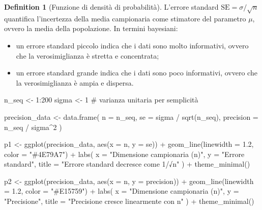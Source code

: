 \documentclass[
  letterpaper,
  DIV=11,
  numbers=noendperiod,
  oneside]{scrreprt}
\newenvironment{Shaded}{\begin{snugshade}}{\end{snugshade}}
\newcommand{\AttributeTok}[1]{\textcolor[rgb]{0.40,0.45,0.13}{#1}}
\newcommand{\CommentTok}[1]{\textcolor[rgb]{0.37,0.37,0.37}{#1}}
\newcommand{\DecValTok}[1]{\textcolor[rgb]{0.68,0.00,0.00}{#1}}
\newcommand{\FloatTok}[1]{\textcolor[rgb]{0.68,0.00,0.00}{#1}}
\newcommand{\FunctionTok}[1]{\textcolor[rgb]{0.28,0.35,0.67}{#1}}
\newcommand{\NormalTok}[1]{\textcolor[rgb]{0.00,0.23,0.31}{#1}}
\newcommand{\OtherTok}[1]{\textcolor[rgb]{0.00,0.23,0.31}{#1}}
\newcommand{\SpecialCharTok}[1]{\textcolor[rgb]{0.37,0.37,0.37}{#1}}
\newcommand{\StringTok}[1]{\textcolor[rgb]{0.13,0.47,0.30}{#1}}
\providecommand{\tightlist}{%
  \setlength{\itemsep}{0pt}\setlength{\parskip}{0pt}}
\theoremstyle{definition}
\theoremstyle{plain}
\theoremstyle{definition}
\newtheorem{definition}{Definition}[chapter]
\theoremstyle{remark}
\begin{document}
\begin{definition}[Funzione di densità di
probabilità]
L'errore standard \(\text{SE} = \sigma/\sqrt{n}\) quantifica
l'incertezza della media campionaria come stimatore del parametro
\(\mu\), ovvero la media della popolazione. In termini bayesiani:

\begin{itemize}
\tightlist
\item
  un errore standard piccolo indica che i dati sono molto informativi,
  ovvero che la verosimiglianza è stretta e concentrata;
\item
  un errore standard grande indica che i dati sono poco informativi,
  ovvero che la verosimiglianza è ampia e dispersa.
\end{itemize}

\begin{Shaded}
\begin{Highlighting}[]
\NormalTok{n\_seq }\OtherTok{\textless{}{-}} \DecValTok{1}\SpecialCharTok{:}\DecValTok{200}
\NormalTok{sigma }\OtherTok{\textless{}{-}} \DecValTok{1}  \CommentTok{\# varianza unitaria per semplicità}

\NormalTok{precision\_data }\OtherTok{\textless{}{-}} \FunctionTok{data.frame}\NormalTok{(}
  \AttributeTok{n =}\NormalTok{ n\_seq,}
  \AttributeTok{se =}\NormalTok{ sigma }\SpecialCharTok{/} \FunctionTok{sqrt}\NormalTok{(n\_seq),}
  \AttributeTok{precision =}\NormalTok{ n\_seq }\SpecialCharTok{/}\NormalTok{ sigma}\SpecialCharTok{\^{}}\DecValTok{2}
\NormalTok{)}

\NormalTok{p1 }\OtherTok{\textless{}{-}} \FunctionTok{ggplot}\NormalTok{(precision\_data, }\FunctionTok{aes}\NormalTok{(}\AttributeTok{x =}\NormalTok{ n, }\AttributeTok{y =}\NormalTok{ se)) }\SpecialCharTok{+}
  \FunctionTok{geom\_line}\NormalTok{(}\AttributeTok{linewidth =} \FloatTok{1.2}\NormalTok{, }\AttributeTok{color =} \StringTok{"\#4E79A7"}\NormalTok{) }\SpecialCharTok{+}
  \FunctionTok{labs}\NormalTok{(}
    \AttributeTok{x =} \StringTok{"Dimensione campionaria (n)"}\NormalTok{,}
    \AttributeTok{y =} \StringTok{"Errore standard"}\NormalTok{,}
    \AttributeTok{title =} \StringTok{"Errore standard decresce come 1/√n"}
\NormalTok{  ) }\SpecialCharTok{+}
  \FunctionTok{theme\_minimal}\NormalTok{()}

\NormalTok{p2 }\OtherTok{\textless{}{-}} \FunctionTok{ggplot}\NormalTok{(precision\_data, }\FunctionTok{aes}\NormalTok{(}\AttributeTok{x =}\NormalTok{ n, }\AttributeTok{y =}\NormalTok{ precision)) }\SpecialCharTok{+}
  \FunctionTok{geom\_line}\NormalTok{(}\AttributeTok{linewidth =} \FloatTok{1.2}\NormalTok{, }\AttributeTok{color =} \StringTok{"\#E15759"}\NormalTok{) }\SpecialCharTok{+}
  \FunctionTok{labs}\NormalTok{(}
    \AttributeTok{x =} \StringTok{"Dimensione campionaria (n)"}\NormalTok{,}
    \AttributeTok{y =} \StringTok{"Precisione"}\NormalTok{,}
    \AttributeTok{title =} \StringTok{"Precisione cresce linearmente con n"}
\NormalTok{  ) }\SpecialCharTok{+}
  \FunctionTok{theme\_minimal}\NormalTok{()}


\end{Highlighting}
\end{Shaded}
\end{definition}
\end{document}
